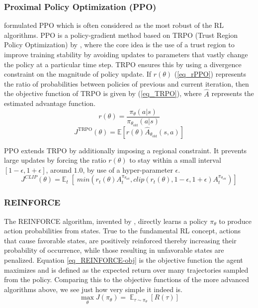 \documentclass[referee, sn-mathphys-num]{sn-jnl}
\begin{document}
	\subsubsection*{Proximal Policy Optimization (PPO)} 
	\cite{PPO-schulman2017} formulated PPO which is often considered as the most robust of the RL algorithms. PPO is a policy-gradient method based on TRPO (Trust Region Policy Optimization) by \cite{TRPO-schulman2015}, where the core idea is the use of a trust region to improve training stability by avoiding updates to parameters that vastly change the policy at a particular time step. TRPO ensures this by using a divergence constraint on the magnitude of policy update. If $r(\theta)$ (\ref{eq_rPPO}) represents the ratio of probabilities between policies of previous and current iteration, then the objective function of TRPO is given by (\ref{eq_TRPO}), where $\hat{A}$ represents the estimated advantage function.
	\begin{equation}\label{eq_rPPO}
		r(\theta) = \frac{\pi_\theta(a \vert s)}{\pi_{\theta_\text{old}}(a \vert s)}
	\end{equation}
	\begin{equation}\label{eq_TRPO}
		J^\text{TRPO} (\theta) = \mathbb{E} [ r(\theta) \hat{A}_{\theta_\text{old}}(s, a) ]
	\end{equation}
	
	PPO extends TRPO by additionally imposing a regional constraint. It prevents large updates by forcing the ratio $r(\theta)$ to stay within a small interval $[1-\epsilon, 1+\epsilon]$, around $1.0$, by use of a hyper-parameter $\epsilon$.
	\begin{equation}\label{eq_PPO}
		J^{CLIP} (\theta) = \mathbb{E}_t \; [ \; min (r_t(\theta) A^{\pi_{\theta_{old}}}_t, clip(r_t(\theta), 1-\epsilon, 1+\epsilon) A^{\pi_{\theta_{old}}}_t)]
	\end{equation}
	
	\subsubsection*{REINFORCE} 
	The REINFORCE algorithm, invented by \cite{REINFORCE-williams1992}, directly learns a policy $\pi_\theta$ to produce action probabilities from states. True to the fundamental RL concept, actions that cause favorable states, are positively reinforced thereby increasing their probability of occurrence, while those resulting in unfavorable states are penalized. Equation \eqref{eq_REINFORCE-obj} is the objective function the agent maximizes and is defined as the expected return over many trajectories sampled from the policy. Comparing this to the objective functions of the more advanced algorithms above, we see just how very simple it indeed is.
	\begin{equation}\label{eq_REINFORCE-obj}
		\max_{\theta} J(\pi_{\theta}) = \mathop{\mathbb{E}}_{\tau \sim \pi_\theta} [R(\tau)]
	\end{equation}
	
\end{document}
